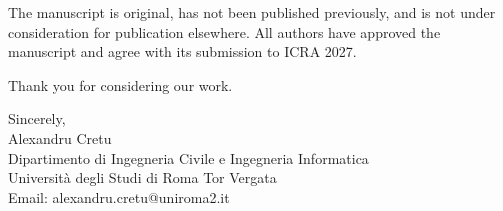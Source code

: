 \documentclass[11pt]{article}
\begin{document}
The manuscript is original, has not been published previously, and is not under consideration for publication elsewhere. All authors have approved the manuscript and agree with its submission to ICRA 2027.

Thank you for considering our work.

\vspace{1em}
\noindent Sincerely,\\
Alexandru Cretu\\
Dipartimento di Ingegneria Civile e Ingegneria Informatica\\
Università degli Studi di Roma Tor Vergata\\
Email: alexandru.cretu@uniroma2.it\\
\end{document}
